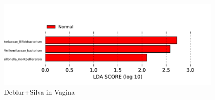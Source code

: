 \documentclass{beamer}
\begin{document}
\begin{frame}[allowframebreaks]
        \begin{figure}
            \includegraphics[width=\linewidth]{figures/LEfSe/Default/everything.Deblur.silva.Vagina.pdf}
            \caption{Deblur+Silva in Vagina}
        \end{figure}
    \end{frame}
\end{document}
